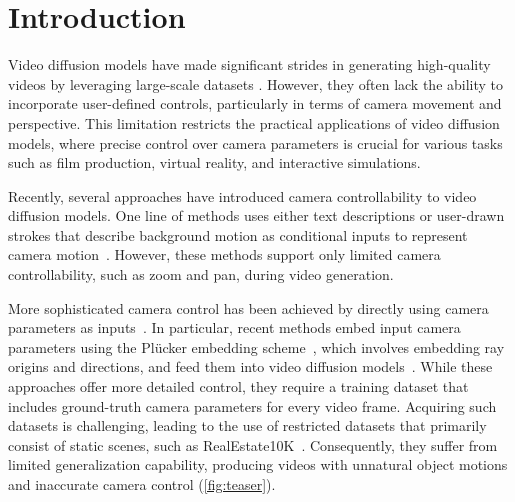 \vspace{-4.5mm}

\section{Introduction}
\label{sec:intro}





Video diffusion models have made significant strides in generating high-quality videos by leveraging large-scale datasets \cite{ho2022video,blattmann2023align,he2022latent,singer2022make,yang2024cogvideox,videoworldsimulators2024,blattmann2023stable,wang2024microcinema,polyak2024movie}. However, they often lack the ability to incorporate user-defined controls, particularly in terms of camera movement and perspective. This limitation restricts the practical applications of video diffusion models, where precise control over camera parameters is crucial for various tasks such as film production, virtual reality, and interactive simulations.

Recently, several approaches have introduced camera controllability to video diffusion models. One line of methods uses either text descriptions or user-drawn strokes that describe background motion as conditional inputs to represent camera motion~\cite{chen2023motion, yin2023dragnuwa, shi2024motion, wang2024motionctrl, polyak2024movie}. However, these methods support only limited camera controllability, such as zoom and pan, during video generation.





More sophisticated camera control has been achieved by directly using camera parameters as inputs~\cite{wang2024motionctrl, he2024cameractrl, xu2024camco, zheng2024cami2v, bahmani2024vd3d, yang2024direct, kuang2024collaborative,zhang2024recapture,xu2024cavia,wang2024humanvid}. 
In particular, recent methods embed input camera parameters using the Pl\"ucker embedding scheme~\cite{sitzmann2021light}, which involves embedding ray origins and directions, and feed them into video diffusion models~\cite{he2024cameractrl, xu2024camco, zheng2024cami2v, bahmani2024vd3d}.
While these approaches offer more detailed control, they require a training dataset that includes ground-truth camera parameters for every video frame. Acquiring such datasets is challenging, leading to the use of restricted datasets that primarily consist of static scenes, such as RealEstate10K~\cite{zhou2018stereo}. 
Consequently, they suffer from limited generalization capability, producing videos with unnatural object motions and inaccurate camera control (\cref{fig:teaser}).


